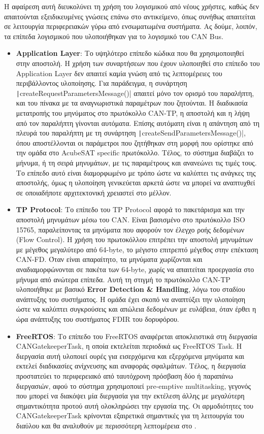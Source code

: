 \documentclass[a4paper,nobib,justified]{tufte-book}
\begin{document}
Η αφαίρεση αυτή διευκολύνει τη χρήση του λογισμικού από νέους χρήστες, καθώς δεν απαιτούνται εξειδικευμένες γνώσεις επάνω στο αντικείμενο, όπως συνήθως απαιτείται σε λειτουργία περιφερειακών γύρω από ενσωματωμένα συστήματα. Ας δούμε, λοιπόν, τα επίπεδα λογισμικού που υλοποιήθηκαν για το λογισμικό του CAN Bus.

\begin{itemize}
	\item \textbf{Application Layer}: Το υψηλότερο επίπεδο κώδικα που θα χρησιμοποιηθεί στην αποστολή. Η χρήση των συναρτήσεων που έχουν υλοποιηθεί στο επίπεδο του Application Layer δεν απαιτεί καμία γνώση από τις λεπτομέρειες του περιβάλλοντος υλοποίησης. Για παράδειγμα, η συνάρτηση \texttt|createRequestParametersMessage()| απαιτεί μόνο τον ορισμό του παραλήπτη, και του πίνακα με τα αναγνωριστικά παραμέτρων που ζητούνται. Η διαδικασία μετατροπής του μηνύματος στο πρωτόκολλο CAN-TP, η αποστολή και η λήψη από τον παραλήπτη γίνονται αυτόματα. Επίσης αυτόματη είναι η απάντηση από τη πλευρά του παραλήπτη με τη συνάρτηση \texttt|createSendParametersMessage()|, όπου αποστέλλονται οι παράμετροι που ζητήθηκαν στη μορφή που ορίστηκε από την ομάδα στο AcubeSAT specific πρωτόκολλο. Τέλος, το σύστημα διαβάζει το μήνυμα, ή τη σειρά μηνυμάτων, με τις παραμέτρους και ανανεώνει τις τιμές τους. Το επίπεδο αυτό είναι διαμορφωμένο με τρόπο ώστε να καλύπτει τις ανάγκες της αποστολής, όμως η υλοποίηση γενικεύεται αρκετά ώστε να μπορεί να αναπτυχθεί σε οποιαδήποτε αρχιτεκτονική χρειαστεί στο μέλλον.
	\item \textbf{TP Protocol}: Το επίπεδο του TP Protocol αφορά το πακετάρισμα και την αποστολή μηνυμάτων μέσω του CAN. Είναι βασισμένο στο πρωτόκολλο ISO 15765, παραλείποντας τα μηνύματα που αφορούν τον έλεγχο ροής δεδομένων (Flow Control). Η χρήση του πρωτοκόλλου επιτρέπει την αποστολή μηνυμάτων με μέγεθος μεγαλύτερο από 64-byte, το μέγιστο επιτρεπτό μέγεθος στην επέκταση CAN-FD. Όταν είναι απαραίτητο, τα μηνύματα χωρίζονται και αναδιαμορφώνονται σε πακέτα των 64-byte, χωρίς να απαιτείται προεργασία στο μήνυμα από ανώτερα επίπεδα. Αυτή τη στιγμή το πρωτόκολλο CAN-TP υλοποιήθηκε με βασικό \textbf{Error Detection \& Handling}, λόγω του σταδίου ανάπτυξης του συστήματος. Η ομάδα έχει σκοπό να αναπτύξει την υλοποίηση ώστε να καλύπτει συγκρούσεις και απώλεια δεδομένων με ευλάβεια, όταν έρθει η ώρα ανάπτυξης του συστήματος FDIR του δορυφόρου.
	\item \textbf{FreeRTOS}: Το επίπεδο του FreeRTOS αναφέρεται αποκλειστικά στη διεργασία CANGatekeeperTask, η οποία εκτελείται περιοδικά ως FreeRTOS Task. Η διεργασία αυτή υλοποιεί ουρές για εισερχόμενα και εξερχόμενα μηνύματα και εκτελεί διαδικασίες ανίχνευσης και αναφοράς σφαλμάτων. Τέλος, η διεργασία προστατεύει το περιφερειακό από ταυτόχρονη πρόσβαση δύο ή παραπάνω διεργασιών, αφού το σύστημα χρησιμοποιεί pre-emptive multitasking, γεγονός που μπορεί να διακόψει μία διεργασία για την εκτέλεση άλλης με μεγαλύτερη σημαντικότητα προτού αυτή ολοκληρώσει την εργασία της. Οι αρμοδιότητες του CANGatekeeperTask κρίνονται εξαιρετικά σημαντικές για τη λειτουργία του διαύλου και θα αναλυθούν με περισσότερη λεπτομέρεια στο .

\end{itemize}
\end{document}
